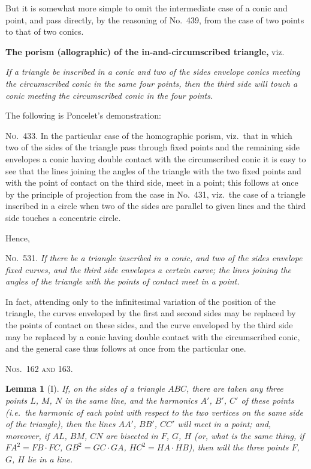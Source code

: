\documentclass[11pt,a4paper]{book}
\newtheorem*{lemma}{Lemma}
\begin{document}
But it is somewhat more simple to omit the intermediate case of a conic and point, and pass directly, by the reasoning of No.~439, from the case of two points to that of two conics.

\newpage
\textbf{The porism (allographic) of the in-and-circumscribed triangle,} viz.

\textit{If a triangle be inscribed in a conic and two of the sides envelope conics meeting the circumscribed conic in the same four points, then the third side will touch a conic meeting the circumscribed conic in the four points.}

The following is Poncelet's demonstration:

\textsc{No.~433.} In the particular case of the homographic porism, viz.\ that in which two of the sides of the triangle pass through fixed points and the remaining side envelopes a conic having double contact with the circumscribed conic it is easy to see that the lines joining the angles of the triangle with the two fixed points and with the point of contact on the third side, meet in a point; this follows at once by the principle of projection from the case in No.~431, viz.\ the case of a triangle inscribed in a circle when two of the sides are parallel to given lines and the third side touches a concentric circle.

Hence,

\textsc{No.~531.} \textit{If there be a triangle inscribed in a conic, and two of the sides envelope fixed curves, and the third side envelopes a certain curve; the lines joining the angles of the triangle with the points of contact meet in a point.}

In fact, attending only to the infinitesimal variation of the position of the triangle, the curves enveloped by the first and second sides may be replaced by the points of contact on these sides, and the curve enveloped by the third side may be replaced by a conic having double contact with the circumscribed conic, and the general case thus follows at once from the particular one.

\textsc{Nos.~162 and 163.}

\begin{lemma}[I]
If, on the sides of a triangle $ABC$, there are taken any three points $L$, $M$, $N$ in the same line, and the harmonics $A'$, $B'$, $C'$ of these points (i.e.\ the harmonic of each point with respect to the two vertices on the same side of the triangle), then the lines $AA'$, $BB'$, $CC'$ will meet in a point; and, moreover, if $AL$, $BM$, $CN$ are bisected in $F$, $G$, $H$ (or, what is the same thing, if $FA^2 = FB \cdot FC$, $GB^2 = GC \cdot GA$, $HC^2 = HA \cdot HB$), then will the three points $F$, $G$, $H$ lie in a line.
\end{lemma}
\end{document}
